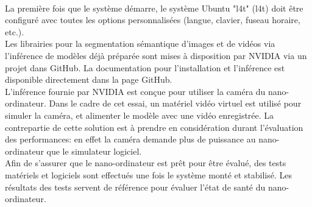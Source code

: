 \vspace{\baselineskip}
\\
\noindent La première fois que le système démarre, le système Ubuntu "\acrlong{l4t}" (\acrshort{l4t}) doit être configuré avec toutes les options personnalisées (langue, clavier, fuseau horaire, etc.).
\vspace{\baselineskip}
\\
\noindent Les librairies pour la segmentation sémantique 
d'images et de vidéos via l'inférence de modèles déjà préparée sont mises à disposition par NVIDIA via un projet dans GitHub. La documentation pour l'installation et l'inférence est disponible directement dans la page GitHub. 
\vspace{\baselineskip}
\\
\noindent L'inférence fournie par NVIDIA est conçue pour utiliser la caméra du nano-ordinateur. Dans le cadre de cet essai, un matériel vidéo virtuel est utilisé pour simuler la caméra, et alimenter le modèle avec une vidéo enregistrée. La contrepartie de cette solution est à prendre en considération durant l'évaluation des performances: en effet la caméra demande plus de puissance au nano-ordinateur que le simulateur logiciel.
\vspace{\baselineskip}
\\
\noindent Afin de s'assurer que le nano-ordinateur est prêt pour être évalué, des tests matériels et logiciels sont effectués une fois le système monté et stabilisé. Les résultats des tests servent de référence pour évaluer l'état de santé du nano-ordinateur. 
